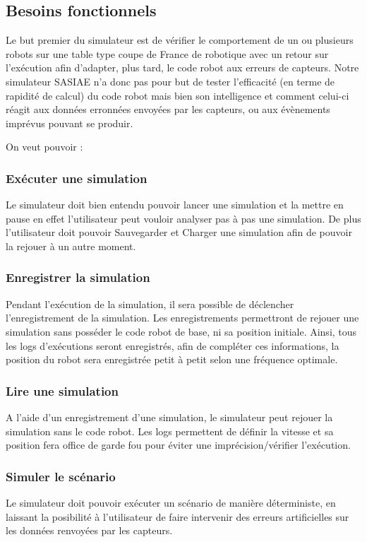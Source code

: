 \subsection{Besoins fonctionnels}

Le but premier du simulateur est de vérifier le comportement de un ou plusieurs robots sur une table type coupe de France de robotique avec un retour sur l'exécution afin d'adapter, plus tard, le code robot aux erreurs de capteurs. Notre simulateur SASIAE n'a donc pas pour but de tester l'efficacité
(en terme de rapidité de calcul)
du code robot mais bien 
son intelligence et
comment celui-ci réagit aux données erronnées envoyées par les capteurs, ou aux évènements imprévus pouvant se produir.

On veut pouvoir :
\subsubsection{Exécuter une simulation}
Le simulateur doit bien entendu pouvoir lancer une simulation et la mettre en pause en effet l'utilisateur peut vouloir analyser pas à pas une simulation. De plus l'utilisateur doit pouvoir Sauvegarder et Charger une simulation afin de pouvoir la rejouer à un autre moment.

\subsubsection{Enregistrer la simulation}
Pendant l'exécution de la simulation, il sera possible de déclencher l'enregistrement de la simulation. Les enregistrements permettront de rejouer une simulation sans posséder le code robot de base, ni sa position initiale. Ainsi, tous les logs d'exécutions seront enregistrés, afin de compléter ces informations, la position du robot sera enregistrée petit à petit selon une fréquence optimale.

\subsubsection{Lire une simulation}
A l'aide d'un enregistrement d'une simulation, le simulateur peut rejouer la simulation sans le code robot. Les logs permettent de définir la vitesse et sa position fera office de garde fou pour éviter une imprécision/vérifier l'exécution.

\subsubsection{Simuler le scénario}
Le simulateur doit pouvoir exécuter un scénario de manière déterministe, en laissant la posibilité à l'utilisateur de faire intervenir des erreurs artificielles sur les données renvoyées par les capteurs.

